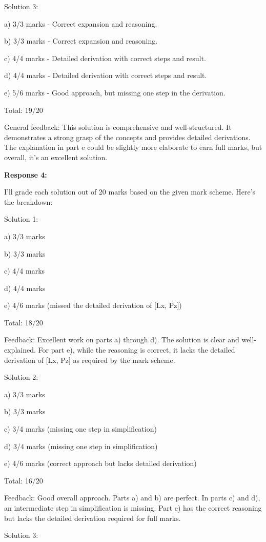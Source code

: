 \documentclass[a4paper,11pt]{article}
\begin{document}
Solution 3:

a) 3/3 marks - Correct expansion and reasoning.

b) 3/3 marks - Correct expansion and reasoning.

c) 4/4 marks - Detailed derivation with correct steps and result.

d) 4/4 marks - Detailed derivation with correct steps and result.

e) 5/6 marks - Good approach, but missing one step in the derivation.

Total: 19/20

General feedback: This solution is comprehensive and well-structured. It demonstrates a strong grasp of the concepts and provides detailed derivations. The explanation in part e could be slightly more elaborate to earn full marks, but overall, it's an excellent solution.

\bigskip
\textbf{Response 4:}

I'll grade each solution out of 20 marks based on the given mark scheme. Here's the breakdown:

Solution 1:

a) 3/3 marks

b) 3/3 marks

c) 4/4 marks

d) 4/4 marks

e) 4/6 marks (missed the detailed derivation of [Lx, Pz])

Total: 18/20

Feedback: Excellent work on parts a) through d). The solution is clear and well-explained. For part e), while the reasoning is correct, it lacks the detailed derivation of [Lx, Pz] as required by the mark scheme.

Solution 2:

a) 3/3 marks

b) 3/3 marks

c) 3/4 marks (missing one step in simplification)

d) 3/4 marks (missing one step in simplification)

e) 4/6 marks (correct approach but lacks detailed derivation)

Total: 16/20

Feedback: Good overall approach. Parts a) and b) are perfect. In parts c) and d), an intermediate step in simplification is missing. Part e) has the correct reasoning but lacks the detailed derivation required for full marks.

Solution 3:
\end{document}
